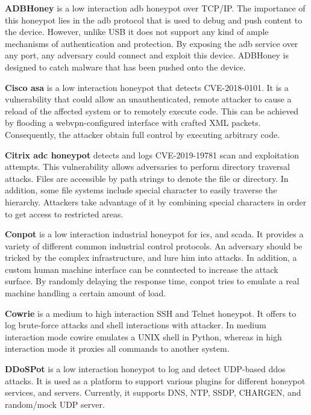 \textbf{ADBHoney} \cite{adbhoney2021} is a low interaction \ac{adb} honeypot over TCP/IP.
The importance of this honeypot lies in the \ac{adb} protocol that is used to debug and push content to the device.
However, unlike USB it does not support any kind of ample mechanisms of authentication and protection.
By exposing the \ac{adb} service over any port, any adversary could connect and exploit this device.
ADBHoney is designed to catch malware that has been pushed onto the device.

\textbf{Cisco \ac{asa}} \cite{cymmetria2018} is a low interaction honeypot that detects CVE-2018-0101\cite{CVE-2018-0101}.
It is a vulnerability that could allow an unauthenticated, remote attacker to cause a reload of the affected system or to remotely execute code.
This can be achieved by flooding a webvpn-configured interface with crafted XML packets.
Consequently, the attacker obtain full control by executing arbitrary code.

\textbf{Citrix \ac{adc} honeypot} \cite{citrixhoneypot2020} detects and logs CVE-2019-19781\cite{CVE-2019-19781} scan and exploitation attempts.
This vulnerability allows adversaries to perform directory traversal attacks. 
Files are accessible by path strings to denote the file or directory.
In addition, some file systems include special character to easily traverse the hierarchy.
Attackers take advantage of it by combining special characters in order to get access to restricted areas. \cite{flanders2019}

\textbf{Conpot} \cite{conpot2021} is a low interaction industrial honeypot for \ac{ics}, and \ac{scada}.
It provides a variety of different common industrial control protocols.
An adversary should be tricked by the complex infrastructure, and lure him into attacks.
In addition, a custom human machine interface can be conntected to increase the attack surface.
By randomly delaying the response time, conpot tries to emulate a real machine handling a certain amount of load.

\textbf{Cowrie} \cite{cowire2021} is a medium to high interaction SSH and Telnet honeypot.
It offers to log brute-force attacks and shell interactions with attacker.
In medium interaction mode cowire emulates a UNIX shell in Python, whereas in high interaction mode it proxies all commands to another system.

\textbf{DDoSPot} \cite{ddosspot2021} is a low interaction honeypot to log and detect UDP-based \ac{ddos} attacks.
It is used as a platform to support various plugins for different honeypot services, and servers.
Currently, it supports DNS, NTP, SSDP, CHARGEN, and random/mock UDP server.

